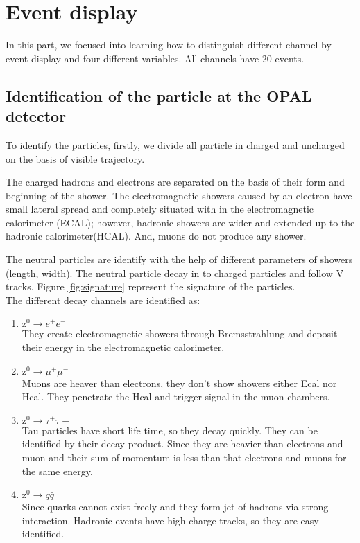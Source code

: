 \clearpage
\section{Event display}
In this part, we focused into learning how to distinguish different channel by event display and four different variables. All channels have 20 events. 



\subsection{Identification of the particle at the OPAL detector}
To identify the particles, firstly, we divide all particle in charged and uncharged on the basis of visible trajectory.

The charged hadrons and electrons are separated on the basis of their form and beginning of the shower. The electromagnetic showers caused by an electron have small lateral spread and completely situated with in the electromagnetic calorimeter (ECAL); however, hadronic showers are wider and extended up to the hadronic calorimeter(HCAL). And, muons do not produce any shower.

 The neutral particles are identify with the help of different parameters of showers (length, width). The neutral particle decay in to charged particles and follow V tracks. Figure \ref{fig:signature} represent the signature of the particles. \\
 

The different decay channels are identified as:
\begin{enumerate}
\item $ \text{z}^0\rightarrow e^+e^- $\\
They create electromagnetic showers through Bremsstrahlung and deposit their energy in the electromagnetic calorimeter. 

\item $ \text{z}^0\rightarrow \mu^+\mu^- $\\ 
Muons are heaver than electrons, they don't show showers either Ecal nor Hcal. They penetrate the Hcal and trigger signal in the muon chambers.

\item $ \text{z}^0\rightarrow \tau^+\tau-$\\
Tau particles have short life time, so they decay quickly. They can be identified by their decay product. Since they are heavier than electrons and muon and their sum of momentum is less than that electrons and muons for the same energy.

\item $ \text{z}^0\rightarrow q\bar{q}$\\
Since quarks cannot exist freely and they form jet of hadrons via strong interaction. Hadronic events have high charge tracks, so they are easy identified.
\end{enumerate}

